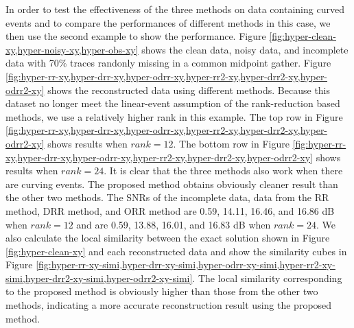 In order to test the effectiveness of the three methods on data containing curved events and to compare the performances of different methods in this case, we then use the second example to show the performance.  Figure \ref{fig:hyper-clean-xy,hyper-noisy-xy,hyper-obs-xy} shows the clean data, noisy data, and incomplete data with 70\% traces randonly missing in a common midpoint gather. Figure \ref{fig:hyper-rr-xy,hyper-drr-xy,hyper-odrr-xy,hyper-rr2-xy,hyper-drr2-xy,hyper-odrr2-xy} shows the reconstructed data using different methods. Because this dataset no longer meet the linear-event assumption of the rank-reduction based methods, we use a relatively higher rank in this example. The top row in Figure \ref{fig:hyper-rr-xy,hyper-drr-xy,hyper-odrr-xy,hyper-rr2-xy,hyper-drr2-xy,hyper-odrr2-xy} shows results when $rank = 12$. The bottom row in Figure \ref{fig:hyper-rr-xy,hyper-drr-xy,hyper-odrr-xy,hyper-rr2-xy,hyper-drr2-xy,hyper-odrr2-xy} shows results when $rank = 24$. It is clear that the three methods also work when there are curving events. The proposed method obtains obviously cleaner result than the other two methods. The SNRs of the incomplete data, data from the RR method, DRR method, and ORR method are 0.59, 14.11, 16.46, and 16.86 dB when $rank=12$ and are 0.59, 13.88, 16.01, and 16.83 dB when $rank=24$. We also calculate the local similarity between the exact solution shown in Figure \ref{fig:hyper-clean-xy} and each reconstructed data and show the similarity cubes in Figure \ref{fig:hyper-rr-xy-simi,hyper-drr-xy-simi,hyper-odrr-xy-simi,hyper-rr2-xy-simi,hyper-drr2-xy-simi,hyper-odrr2-xy-simi}. The local similarity corresponding to the proposed method is obviously higher than those from the  other two methods, indicating a more accurate reconstruction result using the proposed method. 

